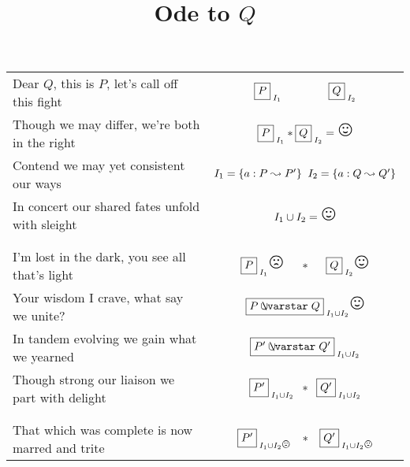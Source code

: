 \documentclass[12pt]{article}
\title{Ode to $Q$}\date{}
\begin{document}
\maketitle
\begin{tabular}{l @{\hspace*{1cm}} c}
Dear $Q$, this is $P$, let's call off this fight
& $\shared{P}{I_1} \hspace*{1.5cm} \shared{Q}{I_2}$\vspace*{2pt}\\

Though we may differ, we're both in the right 
&$\shared{P}{I_1} * \shared{Q}{I_2} = \happyFace$\vspace*{2pt}\\

Contend we may yet consistent our ways 
&$I_1 = \{a : P \mathrel{\leadsto} P'\} \;\; I_2 = \{a: Q \mathrel{\leadsto} Q'\}$\vspace*{2pt}\\

In concert our shared fates unfold with sleight
& $I_1 \cup I_2 = \happyFace$\\\\\\


I'm lost in the dark, you see all that's light
& $\shared{P}{I_1} \sadFace \hspace*{0.5cm} * \hspace*{0.5cm}  \shared{Q}{I_2} \happyFace$\vspace*{2pt}\\

Your wisdom I crave, what say we unite? 
& $\shared{P \sepish Q}{I_1 \cup I_2} \happyFace$\vspace*{2pt}\\

In tandem evolving we gain what we yearned 
& $\shared{P' \sepish Q'}{I_1 \cup I_2} $\vspace*{2pt}\\

Though strong our liaison we part with delight
&$\shared{P'}{I_1 \cup I_2} \;\; *\;\;  \shared{Q'}{I_1 \cup I_2} $\\\\\\


That which was complete is now marred and trite
& $\shared{P'}{I_1 \cup I_2 \frownie}  \;\;\; * \;\;\;  \shared{Q'}{I_1 \cup I_2 \frownie} $\vspace*{2pt}\\


\end{tabular}
\end{document}
